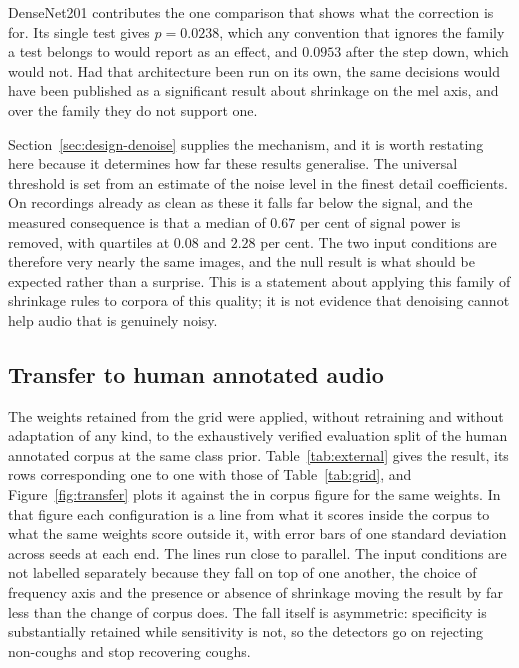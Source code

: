 \documentclass[pdflatex,sn-mathphys-num]{sn-jnl}
\newcommand{\figref}[1]{Figure~\ref{#1}}
\begin{document}
DenseNet201 contributes the one comparison that shows what the correction is for. Its
single test gives $p = 0.0238$, which any convention that ignores the family a test
belongs to would report as an effect, and $0.0953$ after the step down, which would not.
Had that architecture been run on its own, the same decisions would have been published as
a significant result about shrinkage on the mel axis, and over the family they do not
support one.

Section~\ref{sec:design-denoise} supplies the mechanism, and it is worth restating here
because it determines how far these results generalise. The universal threshold is set
from an estimate of the noise level in the finest detail coefficients. On recordings
already as clean as these it falls far below the signal, and the measured consequence is
that a median of $0.67$ per cent of signal power is removed, with quartiles at $0.08$ and
$2.28$ per cent. The two input conditions are therefore very nearly the same images, and
the null result is what should be expected rather than a surprise. This is a statement
about applying this family of shrinkage rules to corpora of this quality; it is not
evidence that denoising cannot help audio that is genuinely noisy.

\subsection{Transfer to human annotated audio}\label{sec:res-external}

The weights retained from the grid were applied, without retraining and without adaptation
of any kind, to the exhaustively verified evaluation split of the human annotated corpus
at the same class prior. Table~\ref{tab:external} gives the result, its rows corresponding one to one with
those of Table~\ref{tab:grid}, and \figref{fig:transfer} plots it against the in corpus
figure for the same weights. In that figure each configuration is a line from what it
scores inside the corpus to what the same weights score outside it, with error bars
of one standard deviation across seeds at each end. The lines run close to
parallel. The input conditions are not labelled separately because they fall on
top of one another, the choice of frequency axis and the presence or absence of
shrinkage moving the result by far less than the change of corpus does.
The fall itself is asymmetric: specificity is substantially retained while sensitivity
is not, so the detectors go on rejecting non-coughs and stop recovering coughs.
\end{document}
